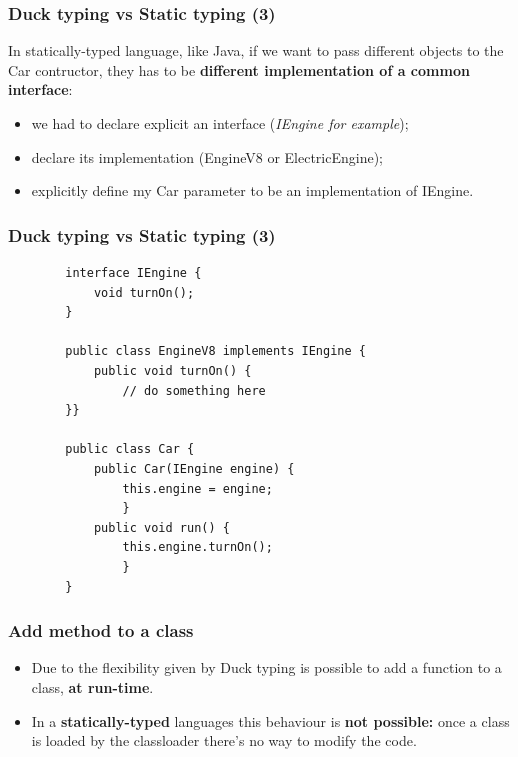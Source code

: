 \documentclass[xcolor ={table,usenames,dvipsnames}]{beamer}
\theoremstyle{definition}
\begin{document}
	\begin{frame}
		\frametitle{Duck typing vs Static typing (3)}
		In statically-typed language, like Java, if we want to pass different objects to the Car contructor, they has to be \textbf{different implementation of a common interface}:
		\begin{itemize}
			\item we had to declare explicit an interface (\textit{IEngine for example});
			\item declare its implementation (EngineV8 or ElectricEngine);
			\item explicitly define my Car parameter to be an implementation of IEngine.
		\end{itemize} 
		
	\end{frame}
	
	\begin{frame}[fragile]
		\frametitle{Duck typing vs Static typing (3)}	
		\begin{lstlisting}
		interface IEngine {
			void turnOn();
		}
		
		public class EngineV8 implements IEngine {
			public void turnOn() {
				// do something here
		}}
		
		public class Car {
			public Car(IEngine engine) {
				this.engine = engine;
				}
			public void run() {
				this.engine.turnOn();
				}
		}
		\end{lstlisting}
	\end{frame}

		
		
		
	
	\begin{frame}[fragile]
		\frametitle{Add method to a class}
		\begin{itemize}
			\item Due to the flexibility given by Duck typing is possible to add a function to a class, \textbf{at run-time}.
			\item In a \textbf{statically-typed} languages this behaviour is \textbf{not possible: }once a class is loaded by the classloader there's no way to modify the code.
		\end{itemize}
	\end{frame}
\end{document}
